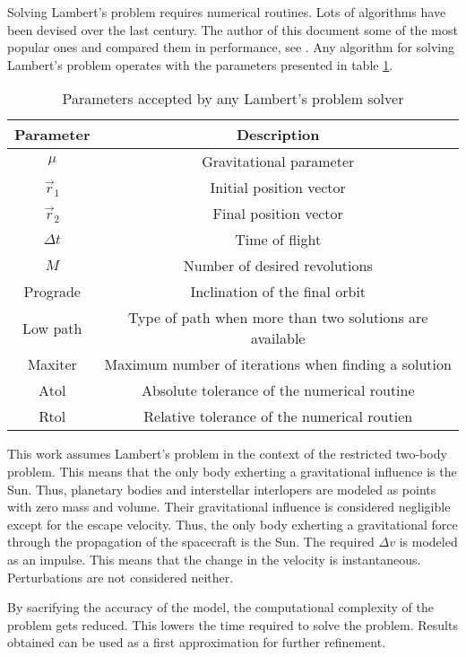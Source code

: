 Solving Lambert's problem requires numerical routines. Lots of algorithms have
been devised over the last century. The author of this document some of the most
popular ones and compared them in performance, see \cite{martinez2021}. Any
algorithm for solving Lambert's problem operates with the parameters presented
in table \ref{tab:lambert-parameters}.

\vspace{1cm}
\begin{table}[H]
  \centering
  \begin{tabular}{|c|c|}
    \hline
    Parameter   & Description                                             \\
    \hline
    $\mu$       & Gravitational parameter                                 \\
    $\vec{r}_1$ & Initial position vector                                 \\
    $\vec{r}_2$ & Final position vector                                   \\
    $\Delta t$  & Time of flight                                          \\
    $M$         & Number of desired revolutions                           \\
    Prograde    & Inclination of the final orbit                          \\
    Low path    & Type of path when more than two solutions are available \\
    Maxiter     & Maximum number of iterations when finding a solution    \\
    Atol        & Absolute tolerance of the numerical routine             \\
    Rtol        & Relative tolerance of the numerical routien             \\
    \hline
  \end{tabular}
  \caption{Parameters accepted by any Lambert's problem solver}
  \label{tab:lambert-parameters}
\end{table}

This work assumes Lambert's problem in the context of the restricted two-body
problem. This means that the only body exherting a gravitational influence is
the Sun. Thus, planetary bodies and interstellar interlopers are modeled as points with zero
mass and volume. Their gravitational influence is considered negligible except
for the escape velocity. Thus, the only body exherting a gravitational force
through the propagation of the spacecraft is the Sun. The required $\Delta v$ is
modeled as an impulse. This means that the change in the velocity is
instantaneous. Perturbations are not considered neither.

By sacrifying the accuracy of the model, the computational complexity of the
problem gets reduced. This lowers the time required to solve the problem.
Results obtained can be used as a first approximation for further refinement.

